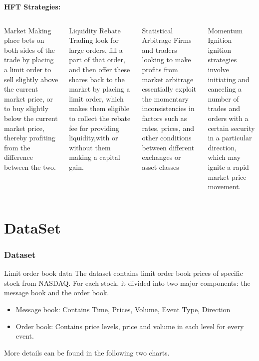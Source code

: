 \documentclass[xcolor={x11names,svgnames,dvipsnames}]{beamer}
\begin{document}
\begin{frame}

\textbf{\large{HFT Strategies:}}

\begin{columns}
\column{2.4in}
\begin{block}{Market Making}
\small{place bets on both sides of the trade by placing a limit order to
sell slightly above the current market price, or to buy slightly below the current
market price, thereby profiting from the difference between the two. }
\end{block}
\begin{block}{Liquidity Rebate Trading
 }
\small{look for large orders, fill a
part of that order, and then offer these shares back to the market by placing a limit order, which makes them eligible to collect the rebate fee for providing liquidity,with or without them making a capital gain.}
\end{block}
\column{2.5in}
\begin{block}{\alert{Statistical Arbitrage}}
\small{Firms and traders looking to make profits from market arbitrage essentially exploit
 the momentary \alert{inconsistencies} in factors such as rates, prices, and other conditions
 between different exchanges or asset classes}
\end{block}
\begin{block}{Momentum Ignition }
\small{ignition strategies involve initiating and canceling a number of trades and orders with a certain security in a particular direction, which may ignite a rapid market price movement.}
\end{block}
\end{columns}
\end{frame}

\section{DataSet}
\begin{frame}
\frametitle{Dataset}
\begin{block}{Limit order book data}
The dataset contains limit order book prices of specific stock from NASDAQ. For each stock, it divided into two major components: the \alert{message book and the order} book.\\
\begin{itemize}
\item Message book: Contains Time, Prices, Volume, Event Type, Direction

\item Order book: Contains price levels, price and volume in each level for every event.  	
\end{itemize}
More details can be found in the following two charts.
\end{block} 

\end{frame}
\end{document}
